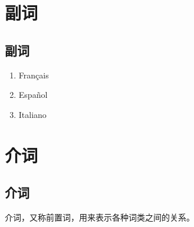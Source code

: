 \documentclass[UTF8,a4paper,titlepage,10pt]{report}
\begin{document}
\chapter{副词}
\label{sec:orge1e31d9}

\section{副词}
\label{sec:orgb6d8305}

\begin{enumerate}
\item Français
\label{sec:org87aaec2}

\item Español
\label{sec:org66ec058}

\item Italiano
\label{sec:org3b439e8}
\end{enumerate}

\chapter{介词}
\label{sec:org32c46ed}

\section{介词}
\label{sec:orgb99b5ef}

介词，又称前置词，用来表示各种词类之间的关系。
\end{document}
